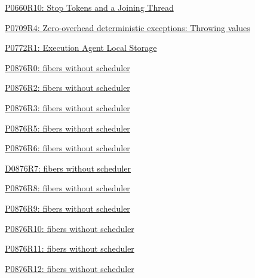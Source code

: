 \begin{thebibliography}{99}
        \href{https://www.open-std.org/jtc1/sc22/wg21/docs/papers/2019/p0660r10.pdf}
        {P0660R10: Stop Tokens and a Joining Thread}

        \href{https://www.open-std.org/jtc1/sc22/wg21/docs/papers/2019/p0709r4.pdf}
        {P0709R4: Zero-overhead deterministic exceptions: Throwing values}

        \href{https://www.open-std.org/jtc1/sc22/wg21/docs/papers/2018/p0772r1.pdf}
        {P0772R1: Execution Agent Local Storage}

        \href{http://www.open-std.org/jtc1/sc22/wg21/docs/papers/2018/p0876r0.pdf}
        {P0876R0: fibers without scheduler}

        \href{http://www.open-std.org/jtc1/sc22/wg21/docs/papers/2018/p0876r2.pdf}
        {P0876R2: fibers without scheduler}

        \href{http://www.open-std.org/jtc1/sc22/wg21/docs/papers/2018/p0876r3.pdf}
        {P0876R3: fibers without scheduler}

        \href{http://www.open-std.org/jtc1/sc22/wg21/docs/papers/2019/p0876r5.pdf}
        {P0876R5: fibers without scheduler}

        \href{http://www.open-std.org/jtc1/sc22/wg21/docs/papers/2019/p0876r6.pdf}
        {P0876R6: fibers without scheduler}

        \href{http://wiki.edg.com/pub/Wg21cologne2019/SG1/D0876R7.pdf}
        {D0876R7: fibers without scheduler}

        \href{http://www.open-std.org/jtc1/sc22/wg21/docs/papers/2019/p0876r8.pdf}
        {P0876R8: fibers without scheduler}

        \href{http://www.open-std.org/jtc1/sc22/wg21/docs/papers/2019/p0876r9.pdf}
        {P0876R9: fibers without scheduler}

        \href{https://www.open-std.org/jtc1/sc22/wg21/docs/papers/2020/p0876r10.pdf}
        {P0876R10: fibers without scheduler}

        \href{https://www.open-std.org/jtc1/sc22/wg21/docs/papers/2022/p0876r11.pdf}
        {P0876R11: fibers without scheduler}

        \href{https://isocpp.org/files/papers/P0876R12.pdf}
        {P0876R12: fibers without scheduler}


\end{thebibliography}
